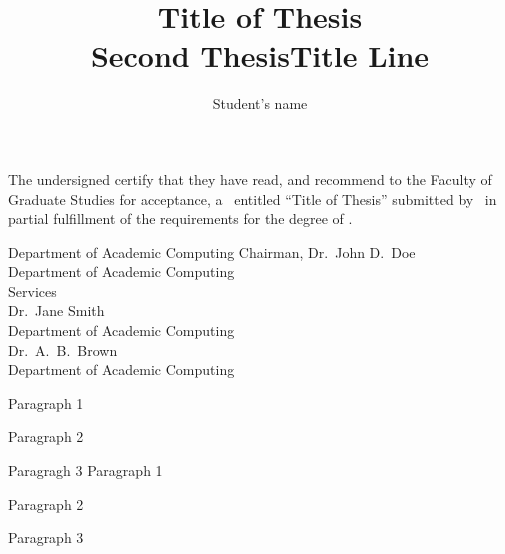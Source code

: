 \documentclass[includeprompt]{ucalgthes}   %
\title{Title of Thesis \\ \bigskip Second ThesisTitle Line }
\author{Student's name}
\newcommand{\thesistitle}{Title of Thesis}
\begin{document}
\makethesistitle
{}     %
\setcounter{page}{2}
\pagestyle{plain}
The undersigned certify that they have read, and recommend
to the Faculty of Graduate Studies for acceptance, a \Thesis\ entitled
``\thesistitle'' submitted by \Author\
in partial fulfillment of the requirements for the degree of
\Degree.

%
%
\begin{signing}{Department of Academic Computing}
\signline
Chairman, Dr.~John D.~Doe \\
Department of Academic Computing \\
Services  \\
\signline
Dr.~Jane Smith \\
Department of Academic Computing  \\
\signline
Dr.~A.~B.~Brown \\
Department of Academic Computing  \\
\end{signing}
%
Paragraph 1

Paragraph 2

Paragragh 3
Paragraph 1

Paragraph 2

Paragraph 3

\begin{singlespace}
\tableofcontents
\listoftables
\listoffigures
\end{singlespace}
\clearpage                   %
\pagestyle{myheadings}






\end{document}
